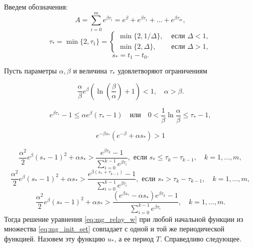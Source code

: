 Введем обозначения:
%
\begin{equation*}
	A = \sum_{i=0}^{m}e^{\beta \tau_{i}}=e^\beta+e^{\beta \tau_1}+\ldots+e^{\beta \tau_{m}},
\end{equation*}
\begin{equation*}
	\tau_* = \min\{2,\tau_1\}=\left\lbrace\begin{array}{cl}
		\min\{2,1/\Delta\}, & \text{ если } \Delta<1,
		\\
		\min\{2,\Delta\}, & \text{ если } \Delta>1,
	\end{array}\right.
\end{equation*}
\begin{equation*}
	s_* = t_1-t_0.
\end{equation*}

\begin{theorem}
	\label{thm:mg_auxiliary_main}
	Пусть параметры $\alpha, \beta$ и величина $\tau_*$ удовлетворяют ограничениям
	
	\begin{equation}
		\label{eq:cond_thm1}
		\frac{\alpha}{\beta}e^{\beta}\left(\ln\left(\frac{\beta}{\alpha}\right)+1\right) < 1,
		\quad
		\alpha > \beta.
	\end{equation}
	
	\begin{equation}
		\label{eq:cond_thm2}
		e^{\beta \tau_*}-1 \leqslant \alpha e^\beta(\tau_*-1)
		\quad\text{или}\quad
		0 < \frac{1}{\beta}\ln\frac{\alpha}{\beta}\leqslant\tau_*-1,
	\end{equation}
	
	\begin{equation}
		\label{eq:cond_th_w>1_t_1+1}
		e^{-\beta s_*}(e^{-\beta}+\alpha s_*)>1
	\end{equation}
	
	\begin{equation}
		\label{eq:cond_hair_hair_01}
		\frac{\alpha^2}{2}e^\beta(s_*-1)^2+\alpha s_*>\frac{e^{\beta \tau_k}-1}{\sum_{i=0}^{k-1}e^{\beta \tau_i}},\text{ если } s_*\leqslant \tau_k-\tau_{k-1},\quad k=1,\ldots,m,
	\end{equation}
	\begin{equation}
		\label{eq:cond_hair_hair_02}
		\frac{\alpha^2}{2}e^\beta(s_*-1)^2+\alpha s_*>\frac{e^{\beta (s_*+\tau_{k-1})}-1}{\sum_{i=0}^{k-1}e^{\beta \tau_i}},\text{ если } s_* > \tau_k-\tau_{k-1},\quad k=1,\ldots,m,
	\end{equation}
	\begin{equation}
		\label{eq:cond_hair_hair_1}
		\frac{\alpha^2}{2}e^\beta( s_*-1)^2+\alpha s_*>\frac{(e^{\beta s_*}-\alpha s_*)e^{\beta \tau_k}-1}{\sum_{i=0}^{k-1}e^{\beta \tau_i}},\quad k=1,\ldots,m.
	\end{equation}
	Тогда решение уравнения \eqref{eq:mg_relay_w} при любой начальной функции из множества \eqref{eq:mg_init_set} совпадает с одной и той же периодической функцией. Назовем эту функцию $u_*$, а ее период $T$. Справедливо следующее.
	

\end{theorem}
